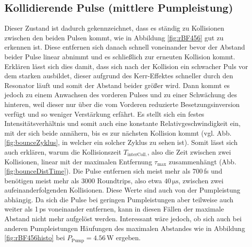 \documentclass[bachelor,       %
               twoside,        %
               BCOR10mm,       %
               liststotoc,nomtotoc,bibtotoc, %
               english,ngerman, %
               final,          %
               ]{GAUBM}
\begin{document}
\subsection{Kollidierende Pulse (mittlere Pumpleistung)}
\label{sec:bounce}
Dieser Zustand ist dadurch gekennzeichnet, dass es ständig zu Kollisionen zwischen den beiden Pulsen kommt, wie in Abbildung \ref{fig:rBF456} gut zu erkennen ist.
Diese entfernen sich danach schnell voneinander bevor der Abstand beider Pulse linear abnimmt und es schließlich zur erneuten Kollision kommt.
Erklären lässt sich dies damit, dass sich nach der Kollision ein schwacher Puls vor dem starken ausbildet, dieser aufgrund des Kerr-Effektes schneller durch den Resonator läuft und somit der Abstand beider größer wird.
Dann kommt es jedoch zu einem Anwachsen des vorderen Pulses und zu einer Schwächung des hinteren, weil dieser nur über die vom Vorderen reduzierte Besetzungsinversion verfügt und so weniger Verstärkung erfährt.
Es stellt sich ein festes Intensitätsverhältnis und somit auch eine konstante Relativgeschwindigkeit ein, mit der sich beide annähern, bis es zur nächsten Kollision kommt (vgl. Abb. \ref{fig:bounceZyklus}, in welcher ein solcher Zyklus zu sehen ist).
Somit lässt sich auch erklären, warum die Kollisionszeit $T_\text{interColl.}$, also die Zeit zwischen zwei Kollisionen, linear mit der maximalen Entfernung $\tau_\text{max}$ zusammenhängt (Abb. \ref{fig:bounceDistTime}).
Die Pulse entfernen sich meist mehr als 700\,fs und benötigen meist mehr als 3000 Roundtrips, also etwa $40\,\si{\micro\second}$, zwischen zwei aufeinanderfolgenden Kollisionen.
Diese Werte sind auch von der Pumpleistung abhängig.
Da sich die Pulse bei geringen Pumpleistungen aber teilweise auch weiter als 1\,ps voneinander entfernen, kann in diesen Fällen der maximale Abstand nicht mehr aufgelöst werden.
Interessant wäre jedoch, ob sich auch bei anderen Pumpleistungen Häufungen des maximalen Abstandes wie in Abbildung \ref{fig:rBF456histo} bei $P_\text{Pump}=4.56\,$W ergeben.
\end{document}
